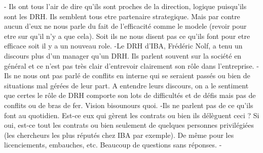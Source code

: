 
- Ils ont tous l'air de dire qu'ils sont proches de la direction, logique puisqu'ils sont les DRH. Ils semblent tous etre partenaire strategique. Mais par contre aucun d'eux ne nous parle du fait de l'efficacité comme le modele (revoir pour etre sur qu'il n'y a que cela). Soit ils ne nous disent pas ce qu'ils font pour etre efficace soit il y a un nouveau role. 
-Le DRH d'IBA, Frédéric Nolf, a tenu un discours plus d'un manager qu'un DRH. Ils parlent souvent sur la société en général et ce n'est pas très clair d'entrevoir clairement son rôle dans l'entreprise.
-Ils ne nous ont pas parlé de conflits en interne qui se seraient passés ou bien de situations mal gérées de leur part. A entendre leurs discours, on a le sentiment que certes le rôle de DRH comporte son lots de difficultés et de défis mais pas de conflits ou de bras de fer. Vision bisounours quoi.
-Ils ne parlent pas de ce qu'ils font au quotidien. Est-ce eux qui gèrent les contrats ou bien ils délèguent ceci ? Si oui, est-ce tout les contrats ou bien seulement de quelques personnes privilégiées (les chercheurs les plus réputés chez IBA par exemple). De même pour les licenciements, embauches, etc. Beaucoup de questions sans réponses.
-